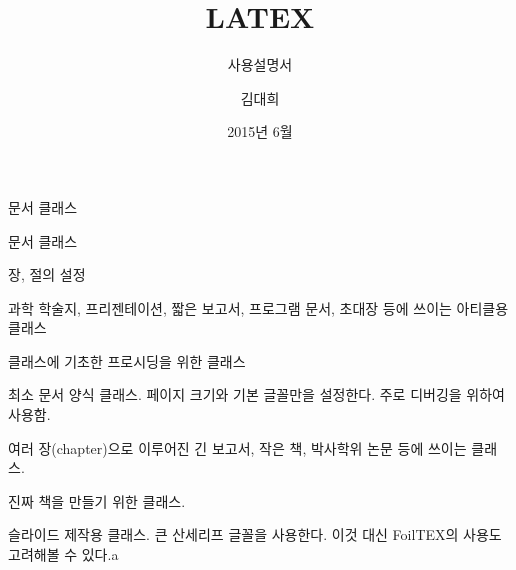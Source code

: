 \documentclass[10pt,xcolor=pdftex,dvipsnames,table,handout]{beamer}
\begin{document}
	

			\title{LATEX}
			\subtitle{사용설명서}
			\author{김대희}
			\date[2015.06.30]{2015년 6월}



		\begin{frame}[plain]
		\titlepage
		\end{frame}

		\begin{frame}[plain]
		\end{frame}



		\begin{frame}[plain]
		\Huge{문서 클래스}
		\end{frame}



		\begin{frame}[t,shrink=20]{문서 클래스}


			\begin{block} {장, 절의 설정}
			\begin{description}[1234567890]
			\item [article] 과학 학술지, 프리젠테이션, 짧은 보고서, 프로그램 문서, 초대장 등에 쓰이는 아티클용 클래스
			\item [proc article] 클래스에 기초한 프로시딩을 위한 클래스 
			\item [minimal] 최소 문서 양식 클래스. 페이지 크기와 기본 글꼴만을 설정한다. 주로 디버깅을 위하여 사용함.
			\item [report] 여러 장(chapter)으로 이루어진 긴 보고서, 작은 책, 박사학위 논문 등에 쓰이는 클래스.
			\item [book] 진짜 책을 만들기 위한 클래스.
			\item [slides] 슬라이드 제작용 클래스. 큰 산세리프 글꼴을 사용한다. 이것 대신 FoilTEX의 사용도 고려해볼 수 있다.a
			\end{description}
			\end{block}


		\end{frame}
\end{document}
